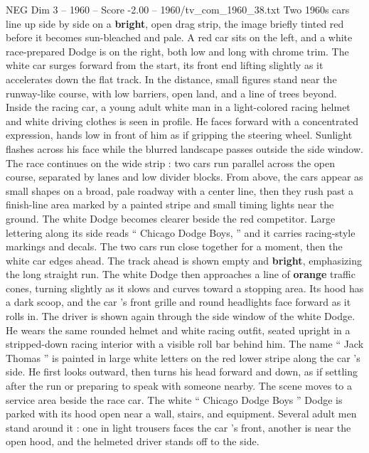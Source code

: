 \begin{textsample}{NEG Dim 3 – 1960 – Score -2.00 – 1960/tv\_com\_1960\_38.txt}  \label{ex:f3_neg_074}
Two 1960s cars line up side by side on a \textbf{bright}, open drag strip, the image briefly tinted red before it becomes sun-bleached and pale.
A red car sits on the left, and a white race-prepared Dodge is on the right, both low and long with chrome trim.
The white car surges forward from the start, its front end lifting slightly as it accelerates down the flat track.
In the distance, small figures stand near the runway-like course, with low barriers, open land, and a line of trees beyond.
Inside the racing car, a young adult white man in a light-colored racing helmet and white driving clothes is seen in profile.
He faces forward with a concentrated expression, hands low in front of him as if gripping the steering wheel.
Sunlight flashes across his face while the blurred landscape passes outside the side window.
The race continues on the wide strip : two cars run parallel across the open course, separated by lanes and low divider blocks.
From above, the cars appear as small shapes on a broad, pale roadway with a center line, then they rush past a finish-line area marked by a painted stripe and small timing lights near the ground.
The white Dodge becomes clearer beside the red competitor.
Large lettering along its side reads “ Chicago Dodge Boys, ” and it carries racing-style markings and decals.
The two cars run close together for a moment, then the white car edges ahead.
The track ahead is shown empty and \textbf{bright}, emphasizing the long straight run.
The white Dodge then approaches a line of \textbf{orange} traffic cones, turning slightly as it slows and curves toward a stopping area.
Its hood has a dark scoop, and the car ’s front grille and round headlights face forward as it rolls in.
The driver is shown again through the side window of the white Dodge.
He wears the same rounded helmet and white racing outfit, seated upright in a stripped-down racing interior with a visible roll bar behind him.
The name “ Jack Thomas ” is painted in large white letters on the red lower stripe along the car ’s side.
He first looks outward, then turns his head forward and down, as if settling after the run or preparing to speak with someone nearby.
The scene moves to a service area beside the race car.
The white “ Chicago Dodge Boys ” Dodge is parked with its hood open near a wall, stairs, and equipment.
Several adult men stand around it : one in light trousers faces the car ’s front, another is near the open hood, and the helmeted driver stands off to the side.

\end{textsample}
